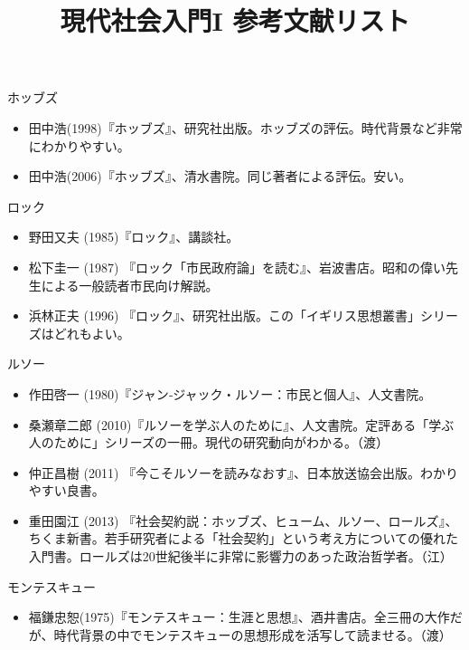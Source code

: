 \documentclass[dvipdfmx]{jsarticle}
\title{現代社会入門I 参考文献リスト}
\begin{document}
\maketitle



ホッブズ

\begin{itemize}
\item 田中浩(1998)『ホッブズ』、研究社出版。ホッブズの評伝。時代背景など非常にわかりやすい。
\item 田中浩(2006)『ホッブズ』、清水書院。同じ著者による評伝。安い。
\end{itemize}


ロック

\begin{itemize}
\item 野田又夫 (1985)『ロック』、講談社。
\item 松下圭一 (1987) 『ロック「市民政府論」を読む』、岩波書店。昭和の偉い先生による一般読者市民向け解説。
\item 浜林正夫 (1996) 『ロック』、研究社出版。この「イギリス思想叢書」シリーズはどれもよい。

\end{itemize}

ルソー

\begin{itemize}
\item 作田啓一 (1980)『ジャン‐ジャック・ルソー：市民と個人』、人文書院。
\item 桑瀬章二郎 (2010)『ルソーを学ぶ人のために』、人文書院。定評ある「学ぶ人のために」シリーズの一冊。現代の研究動向がわかる。（渡）
\item 仲正昌樹 (2011) 『今こそルソーを読みなおす』、日本放送協会出版。わかりやすい良書。
\item 重田園江 (2013) 『社会契約説：ホッブズ、ヒューム、ルソー、ロールズ』、ちくま新書。若手研究者による「社会契約」という考え方についての優れた入門書。ロールズは20世紀後半に非常に影響力のあった政治哲学者。（江）
\end{itemize}



モンテスキュー

\begin{itemize}
\item 福鎌忠恕(1975)『モンテスキュー：生涯と思想』、酒井書店。全三冊の大作だが、時代背景の中でモンテスキューの思想形成を活写して読ませる。（渡）

\end{itemize}
\end{document}
